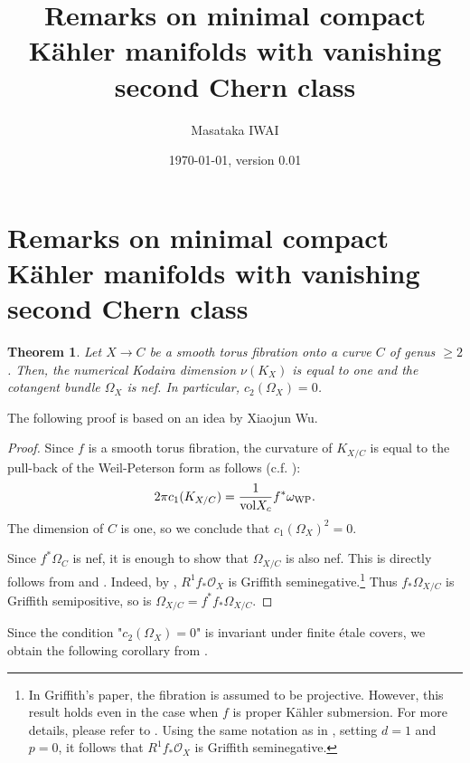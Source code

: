 \documentclass[12pt]{amsart}
\title[Remarks on minimal compact K\"ahler manifolds with vanishing second Chern class]
{Remarks on minimal compact K\"ahler manifolds with vanishing second Chern class}
\author{Masataka IWAI}
\date{\today, version 0.01}
\newtheorem{thm}{Theorem}[section]
\theoremstyle{definition}
\theoremstyle{remark}
\numberwithin{equation}{section}
\begin{document}
\maketitle




\section{Remarks on minimal compact K\"ahler manifolds with vanishing second Chern class}

\begin{thm}
\label{thm-Torus-fibration}
Let $X \to C $ be a smooth torus fibration onto a curve $C$ of genus $\ge 2$.
Then, the numerical Kodaira dimension $\nu(K_{X})$ is equal to one and  the cotangent bundle $\Omega_{X}$ is nef. In particular, $c_2(\Omega_{X})=0$.
\end{thm}

The following proof is based on an idea by Xiaojun Wu.
\begin{proof}
Since $f$ is a smooth torus fibration, the curvature of $K_{X/C}$ is equal to the pull-back of the Weil-Peterson form as follows (c.f. \cite[Equation 1.1]{BCS20}):
$$
2 \pi c_1(K_{X/C}) = \frac{1}{{\rm vol} X_{c}} f^{*}\omega_{{\rm WP}}.
$$
The dimension of $C$ is one, so we conclude that $c_1(\Omega_{X})^2 =0$.

Since $f^{*}\Omega_{C}$ is nef, it is enough to show that $\Omega_{X/C}$ is also nef.
This is directly follows from \cite[Theorem 5.2 and Corollary 7.8]{Gri70} and \cite[Proposition 5]{Kra97}.
Indeed, by \cite{Gri70}, $R^{1}f_{*}\mathcal{O}_{X}$ is Griffith seminegative.\footnote{In Griffith's paper, the  fibration is assumed to be projective. However, this result holds even in the case when $f$ is proper K\"ahler submersion. For more details, please refer to \cite[Section 2.3]{MT07}. Using the same notation as in \cite[Section 2.3]{MT07}, setting $d=1$ and $p=0$, it follows that $R^{1}f_{*}\mathcal{O}_{X}$ is Griffith seminegative.} 
Thus $f_{*}\Omega_{X/C}$ is Griffith semipositive, so is $\Omega_{X/C}=f^{*}f_{*}\Omega_{X/C}$.
\end{proof}

Since the condition "$c_2(\Omega_{X})=0$" is invariant under finite étale covers, we obtain the following corollary from \cite{IM22}.
\end{document}
